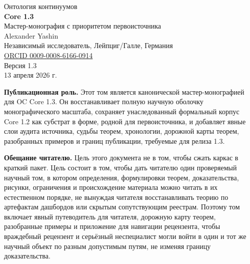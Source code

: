 \begin{titlepage}
\thispagestyle{empty}
\begin{center}
{\Large Онтология континуумов}\\[0.6cm]
{\huge \textbf{Core 1.3}}\\[0.3cm]
{\Large Мастер-монография с приоритетом первоисточника}\\[1.2cm]

{\Large Alexander Yashin}\\[0.2cm]
{\normalsize Независимый исследователь, Лейпциг/Галле, Германия}\\[0.2cm]
{\normalsize \href{https://orcid.org/0009-0008-6166-0914}{ORCID 0009-0008-6166-0914}}\\[1.0cm]

{\normalsize Версия 1.3}\\[0.2cm]
{\normalsize 13 апреля 2026 г.}\\[1.2cm]

\begin{minipage}{0.88\textwidth}
\small
\textbf{Публикационная роль.} Этот том является канонической мастер-монографией для OC Core 1.3.
Он восстанавливает полную научную оболочку монографического масштаба, сохраняет унаследованный формальный корпус
Core 1.2 как субстрат в форме, родной для первоисточника, и добавляет явные слои аудита источника, судьбы теорем,
хронологии, дорожной карты теорем, разобранных примеров и границ публикации, требуемые для релиза 1.3.

\medskip

\textbf{Обещание читателю.} Цель этого документа не в том, чтобы сжать каркас в
краткий пакет. Цель состоит в том, чтобы дать читателю один проверяемый научный том, в котором
определения, формулировки теорем, доказательства, рисунки, ограничения и происхождение материала можно читать в
их естественном порядке, не вынуждая читателя восстанавливать теорию по артефактам дашбордов
или скрытым сопутствующим реестрам. Поэтому том включает явный путеводитель для читателя,
дорожную карту теорем, разобранные примеры и приложение для навигации рецензента, чтобы
враждебный рецензент и серьёзный неспециалист могли войти в один и тот же научный объект по разным допустимым
путям, не изменяя границу доказательства.
\end{minipage}


\end{center}
\end{titlepage}
